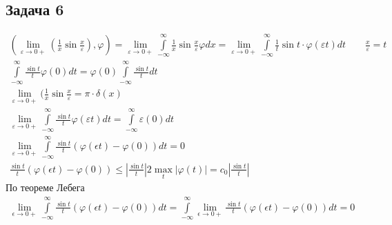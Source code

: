 \subsection*{Задача 6}
	\begin{gather*}
		(\lim\limits_{\varepsilon \to 0+}(\frac{1}{x}\sin \frac{x}{\varepsilon}), \varphi)
		= \lim\limits_{\varepsilon \to 0+} \int\limits_{-\infty}^{\infty} \frac{1}{x}\sin\frac{x}{\varepsilon} \varphi dx
		= \lim\limits_{\varepsilon \to 0+} \int\limits_{-\infty}^{\infty} \frac{1}{t} \sin t \cdot \varphi(\varepsilon t) dt\qquad \frac{x}{\varepsilon} = t\\
		\int\limits_{-\infty}^{\infty} \frac{\sin t}{t} \varphi(0) dt
		= \varphi(0) \int\limits_{-\infty}^{\infty} \frac{\sin t}{t} dt\\
		\lim\limits_{\varepsilon \to 0+}(\frac{1}{x}\sin \frac{x}{\varepsilon} = \pi \cdot \delta(x)\\
		\lim\limits_{\varepsilon \to 0+} \int\limits_{-\infty}^{\infty} \frac{\sin t}{t} \varphi(\varepsilon t) dt
		= \int\limits_{-\infty}^{\infty} \varepsilon(0)dt\\
		\lim\limits_{\varepsilon \to 0+} \int\limits_{-\infty}^{\infty} \frac{\sin t}{t} (\varphi(\epsilon t) - \varphi(0))dt = 0\\
		\frac{\sin t}{t} (\varphi(\epsilon t) - \varphi(0))
		\leqslant \left|\frac{\sin t}{t}\right| 2 \max\limits_{t} |\varphi(t)| = c_{0} \left|\frac{\sin t}{t}\right|
	\end{gather*}
	По теореме Лебега
	\begin{gather*}
		\lim\limits_{\epsilon \to 0+} \int\limits_{-\infty}^{\infty} \frac{\sin t}{t} (\varphi(\epsilon t) - \varphi(0))dt
		= \int\limits_{-\infty}^{\infty}\lim\limits_{\epsilon \to 0+} \frac{\sin t}{t} (\varphi(\epsilon t) - \varphi(0))dt
		= 0
	\end{gather*}
\begin{comment}
	\begin{gather*}
		\delta(\varphi) = \varphi(0)\\
		F(\varphi) = \int_{G} f(x) \varphi(x) dx
	\end{gather*}
	Фиксируем основную $\phi(x)$
	\begin{gather*}
		\left(\frac{1}{x} \sin \frac{x}{0}, \varphi\right)
		= \lim\limits_{\varepsilon \to +0} \int\limits_{-\infty}^{\infty} \frac{\sin \frac{x}{\varepsilon} \varphi(x)}{x} dx
		= \lim\limits_{\varepsilon \to +0} \int\limits_{-R}^{R} \frac{\sin \frac{x}{\varepsilon} \varphi(x)}{x} = (1)\\
		y = \frac{x}{\varepsilon} \Rightarrow dx = \varepsilon dy\\
		(1) = \lim\limits_{\varepsilon \to +0} \int\limits_{-\infty}^{\infty} \frac{\sin(y) \varphi(\varepsilon y)}{\varepsilon y} \varepsilon dy = (2)\\
		\int\limits_{0}^{+\infty} \frac{\sin(y)}{y}dy = \frac{\pi}{2}\qquad
		\int\limits_{-\infty}^{+\infty} \frac{\sin(y)}{y}dy = \pi\\
		(2) = \int\limits_{-\infty}^{\infty} \frac{\sin(y) \varphi(0)}{y} dy
		= \pi \varphi(0) = \pi(\delta, \varphi)
	\end{gather*}
\end{comment}
\vskip 0.4in


